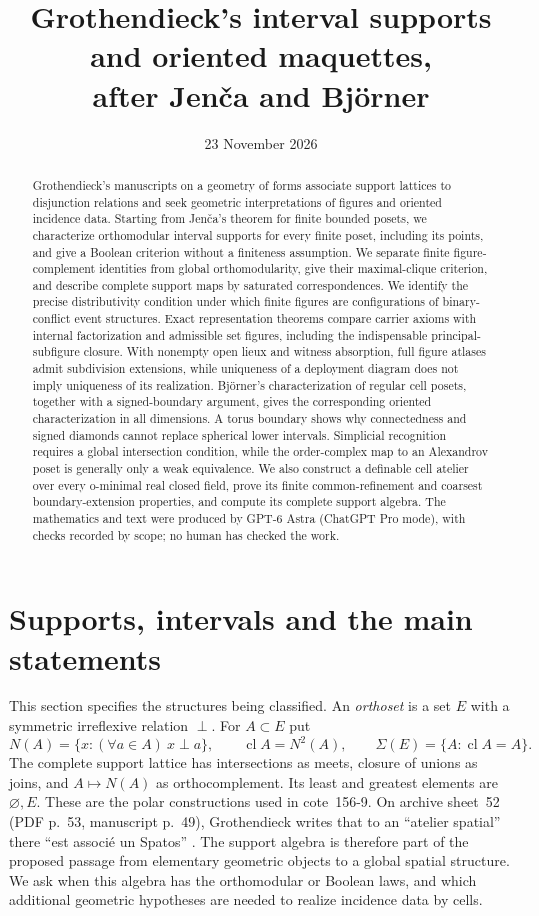 \documentclass[11pt,a4paper]{article}
\title{Grothendieck's interval supports and oriented maquettes,\\ after Jen\v ca and Bj\"orner}
\author{}
\date{23 November 2026}
\theoremstyle{definition}
\newcommand{\cl}{\operatorname{cl}}
\begin{document}
\maketitle
\begin{abstract}
Grothendieck's manuscripts on a geometry of forms associate support lattices to disjunction relations and seek geometric interpretations of figures and oriented incidence data. Starting from Jen\v ca's theorem for finite bounded posets, we characterize orthomodular interval supports for every finite poset, including its points, and give a Boolean criterion without a finiteness assumption. We separate finite figure-complement identities from global orthomodularity, give their maximal-clique criterion, and describe complete support maps by saturated correspondences. We identify the precise distributivity condition under which finite figures are configurations of binary-conflict event structures. Exact representation theorems compare carrier axioms with internal factorization and admissible set figures, including the indispensable principal-subfigure closure. With nonempty open lieux and witness absorption, full figure atlases admit subdivision extensions, while uniqueness of a deployment diagram does not imply uniqueness of its realization. Bj\"orner's characterization of regular cell posets, together with a signed-boundary argument, gives the corresponding oriented characterization in all dimensions. A torus boundary shows why connectedness and signed diamonds cannot replace spherical lower intervals. Simplicial recognition requires a global intersection condition, while the order-complex map to an Alexandrov poset is generally only a weak equivalence. We also construct a definable cell atelier over every o-minimal real closed field, prove its finite common-refinement and coarsest boundary-extension properties, and compute its complete support algebra. The mathematics and text were produced by GPT-6 Astra (ChatGPT Pro mode), with checks recorded by scope; no human has checked the work.
\end{abstract}

\section{Supports, intervals and the main statements}
This section specifies the structures being classified. An \emph{orthoset} is a set $E$ with a symmetric irreflexive relation $\perp$. For $A\subset E$ put
\[
 N(A)=\{x:(\forall a\in A)\ x\perp a\},\qquad
 \cl A=N^2(A),\qquad\Sigma(E)=\{A:\cl A=A\}.
\]
The complete support lattice has intersections as meets, closure of unions as joins, and $A\mapsto N(A)$ as orthocomplement. Its least and greatest elements are $\varnothing,E$. These are the polar constructions used in cote~156-9. On archive sheet~52 (PDF p.~53, manuscript p.~49), Grothendieck writes that to an ``atelier spatial'' there ``est associ\'e un Spatos'' \cite{Groth}. The support algebra is therefore part of the proposed passage from elementary geometric objects to a global spatial structure. We ask when this algebra has the orthomodular or Boolean laws, and which additional geometric hypotheses are needed to realize incidence data by cells.
\end{document}
